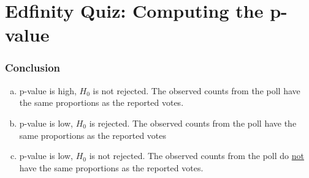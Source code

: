 \documentclass[slidestop,compress,mathserif]{beamer}
\begin{document}

\section{Edfinity Quiz: Computing the p-value}


\begin{frame}
\frametitle{Conclusion}


\begin{enumerate}[(a)]
\item p-value is high, $H_0$ is not rejected. The observed counts from the poll have the same proportions as the reported votes.
\item p-value is low, $H_0$ is rejected. The observed counts from the poll have the same proportions as the reported votes
\item p-value is low, $H_0$ is not rejected. The observed counts from the poll do \underline{not} have the same proportions as the reported votes.
\end{enumerate}

\end{frame}


\end{document}
